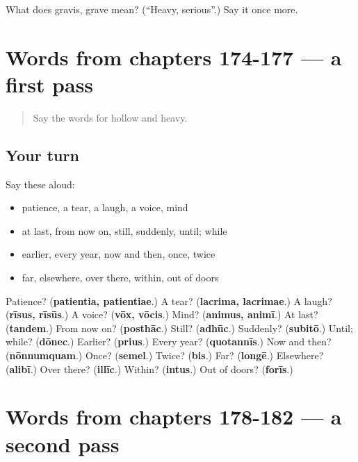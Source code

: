 \begin{tcolorbox}[breakable,colback=teal!4,colframe=teal!35!black,title={Before you move on}]
What does gravis, grave mean? (\textquotedblleft{}Heavy, serious\textquotedblright{}.) Say it once more.
\end{tcolorbox}
\section[(dialogue)]{Words from chapters 174-177 — a first pass}

\label{lesson:LA-R182-first-pass-words-from-chapters-174-177}



\begin{quote}
Say the words for hollow and heavy.
\end{quote}

\subsection*{Your turn}
Say these aloud:

\begin{itemize}
\raggedright
  \item patience, a tear, a laugh, a voice, mind
  \item at last, from now on, still, suddenly, until; while
  \item earlier, every year, now and then, once, twice
  \item far, elsewhere, over there, within, out of doors
\end{itemize}

\begin{tcolorbox}[breakable,colback=teal!4,colframe=teal!35!black,title={Before you move on}]
Patience? (\textbf{patientia, patientiae}.) A tear? (\textbf{lacrima, lacrimae}.) A laugh? (\textbf{rīsus, rīsūs}.) A voice? (\textbf{vōx, vōcis}.) Mind? (\textbf{animus, animī}.) At last? (\textbf{tandem}.) From now on? (\textbf{posthāc}.) Still? (\textbf{adhūc}.) Suddenly? (\textbf{subitō}.) Until; while? (\textbf{dōnec}.) Earlier? (\textbf{prius}.) Every year? (\textbf{quotannīs}.) Now and then? (\textbf{nōnnumquam}.) Once? (\textbf{semel}.) Twice? (\textbf{bis}.) Far? (\textbf{longē}.) Elsewhere? (\textbf{alibī}.) Over there? (\textbf{illīc}.) Within? (\textbf{intus}.) Out of doors? (\textbf{forīs}.)
\end{tcolorbox}
\section[(dialogue)]{Words from chapters 178-182 — a second pass}

